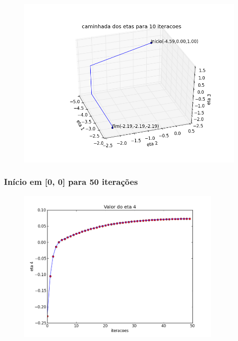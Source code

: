 \documentclass[12pt]{article}
\begin{document}
\begin{figure}[!h]
\begin{center}
\includegraphics[width=12cm]{2_2_caminhada.png}
\end{center}
\end{figure}

\clearpage
\subsubsection{Início em [0, 0] para 50 iterações}
\mbox{}

\begin{figure}[!h]
\begin{center}
\includegraphics[width=10cm]{0_0_eta_4.png}
\end{center}
\end{figure}
\end{document}
